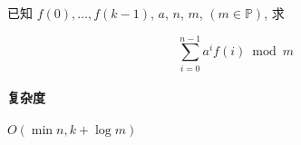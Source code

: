 已知 \(f(0),\dots,f(k-1)\), \(a\), \(n\), \(m\), \((m\in\mathbb{P})\), 求

\[
    \sum_{i=0}^{n-1} a^i f(i)\bmod{m}
\]

\paragraph{复杂度}

\(O(\min{n,k}+\log m)\)
